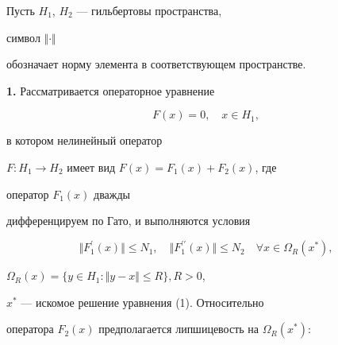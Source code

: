 \date{}




\pagestyle{plain} %







\maketitle


\label{begin}











Пусть $H_1$, $H_2$ --- гильбертовы пространства,


символ $\Vert \cdot \Vert$


обозначает норму элемента в соответствующем пространстве. 


\medskip





{\bf 1.} Рассматривается операторное уравнение


\begin{equation}


F(x)=0, \quad x \in H_1,


\end{equation}


в котором нелинейный оператор


$F: H_1 \to H_2$ имеет вид $F(x)=F_1 (x)+ F_2(x)$, где


оператор $F_1 (x)$ дважды


дифференцируем по Гато, и выполняются условия


\begin{equation}


\Vert F_1^{\prime}(x) \Vert \leq N_1, \quad


\Vert F_1^{\prime\prime}(x) \Vert \leq N_2 \quad


\forall x \in \Omega_R (x^*),


\end{equation}


$\Omega_R (x)=\{ y \in H_1: \Vert y-x \Vert \leq R \}, R>0$,


$x^*$ --- искомое решение уравнения (1). Относительно


оператора $F_2 (x)$ предполагается липшицевость на $\Omega_R (x^*)$:


